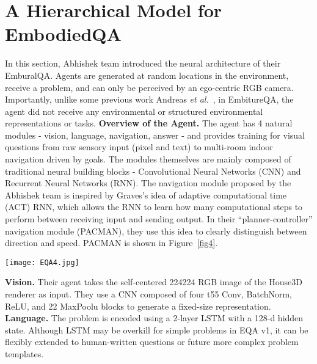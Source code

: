 \documentclass[10pt,twocolumn,letterpaper]{article}
\begin{document}
       \section{A Hierarchical Model for EmbodiedQA}
       In this section, Abhishek team introduced the neural architecture of their EmburalQA. Agents are generated at random locations in the environment, receive a problem, and can only be perceived by an ego-centric RGB camera. Importantly, unlike some previous work Andreas \emph{et al.}~\cite{[28]}, in EmbitureQA, the agent did not receive any environmental or structured environmental representations or tasks.
       \textbf{Overview of the Agent.} The agent has 4 natural modules - vision, language, navigation, answer - and provides training for visual questions from raw sensory input (pixel and text) to multi-room indoor navigation driven by goals. The modules themselves are mainly composed of traditional neural building blocks - Convolutional Neural Networks (CNN) and Recurrent Neural Networks (RNN). The navigation module proposed by the Abhishek team is inspired by Graves's idea of adaptive computational time (ACT) RNN, which allows the RNN to learn how many computational steps to perform between receiving input and sending output. In their ``planner-controller'' navigation module (PACMAN), they use this idea to clearly distinguish between direction and speed. PACMAN is shown in Figure~\ref{fig4}. \\
       \begin{figure*}[ht]
        \begin{center}
        \texttt{[image: EQA4.jpg]}
        \end{center}
        \caption{Their PACMAN navigator decomposes navigation into a planner and a controller. The planner selects actions and the controller executes these actions a variable number of times. This enables the planner to operate on shorter timescales, strengthening gradient flows.}
        \label{fig4}
        \end{figure*}
        \textbf{Vision.} Their agent takes the self-centered 224224 RGB image of the House3D renderer as input. They use a CNN composed of four t55 Conv, BatchNorm, ReLU, and 22 MaxPoolu blocks to generate a fixed-size representation. \\
        \textbf{Language.} The problem is encoded using a 2-layer LSTM with a 128-d hidden state. Although LSTM may be overkill for simple problems in EQA v1, it can be flexibly extended to human-written questions or future more complex problem templates. \\
\end{document}
